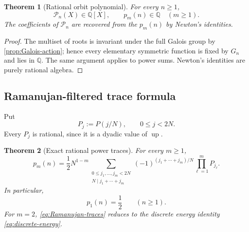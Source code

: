 \documentclass[11pt,oneside]{article}
\newtheorem{theorem}{Theorem}[section]
\theoremstyle{definition}
\theoremstyle{remark}
\newcommand{\Q}{\mathbb Q}
\newcommand{\Up}{\operatorname{up}}
\begin{document}
\begin{theorem}[Rational orbit polynomial]\label{thm:rational-orbit-poly}
For every $n\ge1$,
\begin{equation}\label{eq:orbit-poly-rational}
 \mathcal P_n(X)\in\Q[X],
 \qquad
 p_m(n)\in\Q\quad(m\ge1).
\end{equation}
The coefficients of $\mathcal P_n$ are recovered from the $p_m(n)$ by Newton's
identities.
\end{theorem}

\begin{proof}
The multiset of roots is invariant under the full Galois group by
\cref{prop:Galois-action}; hence every elementary symmetric function is fixed
by $G_n$ and lies in $\Q$.  The same argument applies to power sums.  Newton's
identities are purely rational algebra.
\end{proof}

\subsection{Ramanujan-filtered trace formula}

Put
\begin{equation}\label{eq:P-j-sample}
 P_j:=P(j/N),
 \qquad 0\le j<2N.
\end{equation}
Every $P_j$ is rational, since it is a dyadic value of $\Up$.

\begin{theorem}[Exact rational power traces]\label{thm:Ramanujan-traces}
For every $m\ge1$,
\begin{equation}\label{eq:Ramanujan-traces}
\boxed{
 p_m(n)=\frac12N^{1-m}
 \sum_{\substack{0\le j_1,\ldots,j_m<2N\\
                  N\mid j_1+\cdots+j_m}}
 (-1)^{(j_1+\cdots+j_m)/N}
 \prod_{\ell=1}^{m}P_{j_\ell}.}
\end{equation}
In particular,
\begin{equation}\label{eq:universal-trace}
 \boxed{p_1(n)=\frac12\qquad(n\ge1).}
\end{equation}
For $m=2$, \eqref{eq:Ramanujan-traces} reduces to the discrete energy identity
\eqref{eq:discrete-energy}.
\end{theorem}
\end{document}
